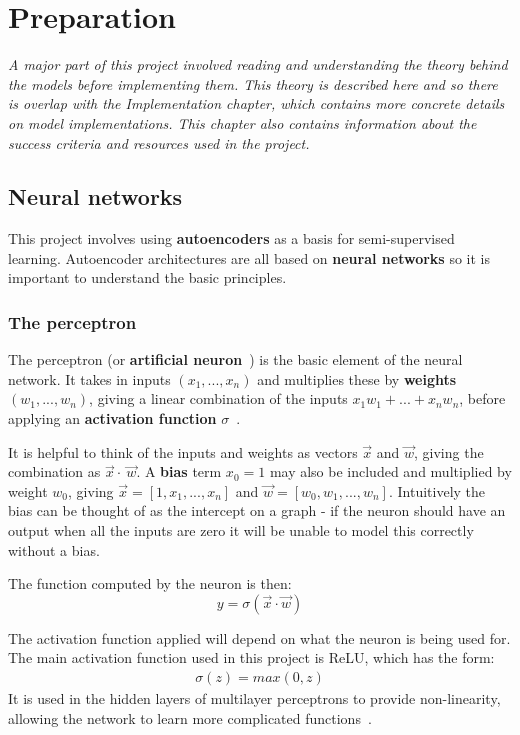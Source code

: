 \chapter{Preparation}

\textit{A major part of this project involved reading and understanding the theory behind the models before implementing them. This theory
is described here and so there is overlap with the Implementation chapter, which contains more concrete details on model implementations. 
This chapter also contains information about the success 
criteria and resources used in the project.}

\section{Neural networks}

This project involves using \textbf{autoencoders} as a basis for semi-supervised learning. 
Autoencoder architectures are all based on \textbf{neural networks} so it is important to understand the basic principles.

\subsection{The perceptron}

The perceptron (or \textbf{artificial neuron}~\cite{WhatareA61:online}) is the basic element of the neural network. It takes in inputs $(x_1, ..., x_n)$ and 
multiplies these by \textbf{weights} $(w_1, ..., w_n)$, giving a linear combination of the inputs $x_1w_1 + ... + x_nw_n$, before applying 
an \textbf{activation function} $\sigma$~\cite{Art_Int}.

It is helpful to think of the inputs and weights as 
vectors $\vec{x}$ and $\vec{w}$, giving the combination as $\vec{x} \cdot \ \vec{w}$. A \textbf{bias} term $x_0=1$ may also be included and multiplied by 
weight $w_0$, giving $\vec{x} = [1, x_1, ..., x_n]$ and $\vec{w} = [w_0, w_1, ..., w_n]$. Intuitively the bias can be thought of as the intercept
on a graph - if the neuron should have an output when all the inputs are zero it will be unable to model this correctly without a bias.

The function computed by the neuron is then:
\begin{equation}
  y = \sigma(\vec{x} \cdot \vec{w})
\end{equation}

The activation function applied will depend on what the neuron is being used for.
The main activation function used in this project is ReLU, which has the form:
\begin{align}
  \sigma(z) = max(0, z)
  \label{eq:relu}
\end{align}
It is used in the hidden layers of multilayer perceptrons to provide non-linearity, allowing the network to learn more 
complicated functions~\cite{relu}.

